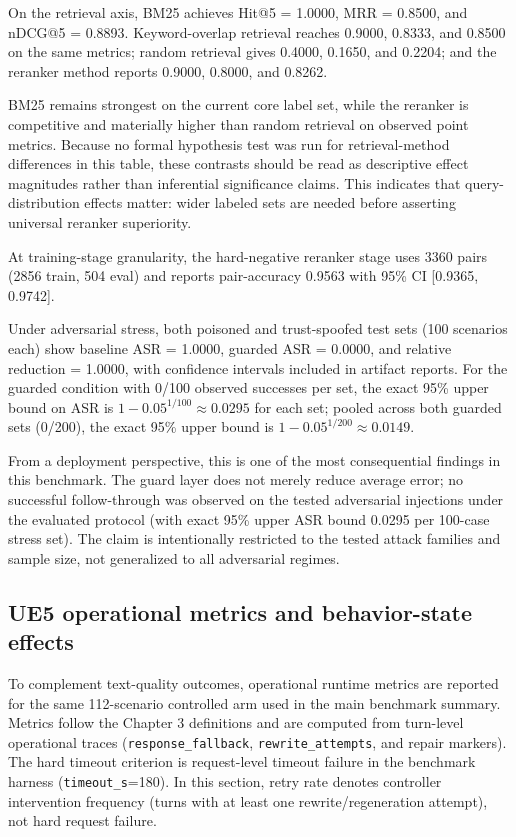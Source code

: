 ﻿\documentclass[a4paper,12pt]{article}
\begin{document}
On the retrieval axis, BM25 achieves Hit@5 = 1.0000, MRR = 0.8500, and nDCG@5 = 0.8893. Keyword-overlap retrieval reaches 0.9000, 0.8333, and 0.8500 on the same metrics; random retrieval gives 0.4000, 0.1650, and 0.2204; and the reranker method reports 0.9000, 0.8000, and 0.8262.

BM25 remains strongest on the current core label set, while the reranker is competitive and materially higher than random retrieval on observed point metrics. Because no formal hypothesis test was run for retrieval-method differences in this table, these contrasts should be read as descriptive effect magnitudes rather than inferential significance claims. This indicates that query-distribution effects matter: wider labeled sets are needed before asserting universal reranker superiority.

At training-stage granularity, the hard-negative reranker stage uses 3360 pairs (2856 train, 504 eval) and reports pair-accuracy 0.9563 with 95\% CI [0.9365, 0.9742].

Under adversarial stress, both poisoned and trust-spoofed test sets (100 scenarios each) show baseline ASR = 1.0000, guarded ASR = 0.0000, and relative reduction = 1.0000, with confidence intervals included in artifact reports. For the guarded condition with 0/100 observed successes per set, the exact 95\% upper bound on ASR is \(1-0.05^{1/100}\approx 0.0295\) for each set; pooled across both guarded sets (0/200), the exact 95\% upper bound is \(1-0.05^{1/200}\approx 0.0149\).

From a deployment perspective, this is one of the most consequential findings in this benchmark. The guard layer does not merely reduce average error; no successful follow-through was observed on the tested adversarial injections under the evaluated protocol (with exact 95\% upper ASR bound 0.0295 per 100-case stress set). The claim is intentionally restricted to the tested attack families and sample size, not generalized to all adversarial regimes.

\subsection{UE5 operational metrics and behavior-state effects}
To complement text-quality outcomes, operational runtime metrics are reported for the same 112-scenario controlled arm used in the main benchmark summary. Metrics follow the Chapter 3 definitions and are computed from turn-level operational traces (\texttt{response\_fallback}, \texttt{rewrite\_attempts}, and repair markers). The hard timeout criterion is request-level timeout failure in the benchmark harness (\texttt{timeout\_s}=180). In this section, retry rate denotes controller intervention frequency (turns with at least one rewrite/regeneration attempt), not hard request failure.
\end{document}
